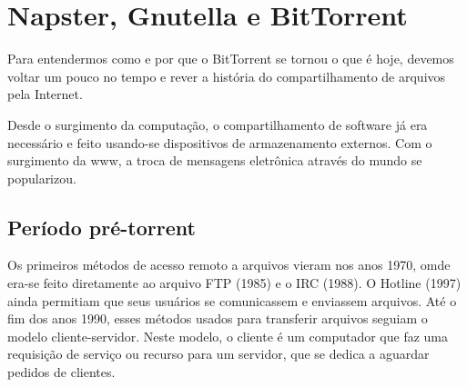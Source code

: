 
\chapter{Napster, Gnutella e BitTorrent}

\begin{comment}
Vou contar a história do BitTorrent, desde o aumento do uso de
transferências de dados via internet, passando pela criação de protocolos e softwares
usados para baixar arquivos de forma ilegal, até a sua criação e o boom de usuários que
o utilizam para essa motivação. Em paralelo, discutirei os motivos legais pelos quais os
softwares anteriores foram descontinuados, que influenciaram diretamente na sua criação.

Separarei em 3 períodos: o antes, a criação e as consequências disso no mundo.
\end{comment}

Para entendermos como e por que o BitTorrent se tornou o que é hoje, devemos voltar um
pouco no tempo e rever a história do compartilhamento de arquivos pela Internet.



Desde o surgimento da computação, o compartilhamento de software já era necessário e
feito usando-se dispositivos de armazenamento externos. Com o surgimento da \Gls{www},
a troca de mensagens eletrônica através do mundo se popularizou.

\section{Período pré-torrent}

Os primeiros métodos de acesso remoto a arquivos vieram nos anos 1970, omde era-se feito diretamente ao arquivo FTP (1985) e o
IRC (1988). O Hotline (1997) ainda permitiam que seus usuários se comunicassem e
enviassem arquivos. Até o fim dos anos 1990, esses métodos usados para transferir arquivos seguiam
o modelo cliente-servidor. Neste modelo, o cliente é um computador que faz uma requisição
de serviço ou recurso para um servidor, que se dedica a aguardar pedidos de clientes.

